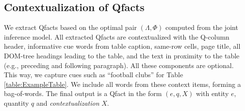 \subsection{Contextualization of Qfacts}
We extract Qfacts based on the optimal pair $(\Lambda, \Phi)$ computed from the joint inference model. All extracted 
Qfacts are contextualized with 
the Q-column header,
informative cue words from table caption, same-row cells, page title, all DOM-tree headings leading to the table, and the text in proximity to the table (e.g., preceding and following paragraph).
All these components are optional.
This way, we capture cues such as ``football clubs''
for Table \ref{table:ExampleTable}.
We include all words 
from these context items, forming a bag-of-words.
The final output is a Qfact in the form
$(e,q,X)$ with entity $e$, quantity $q$ and \textit{contextualization} $X$.



